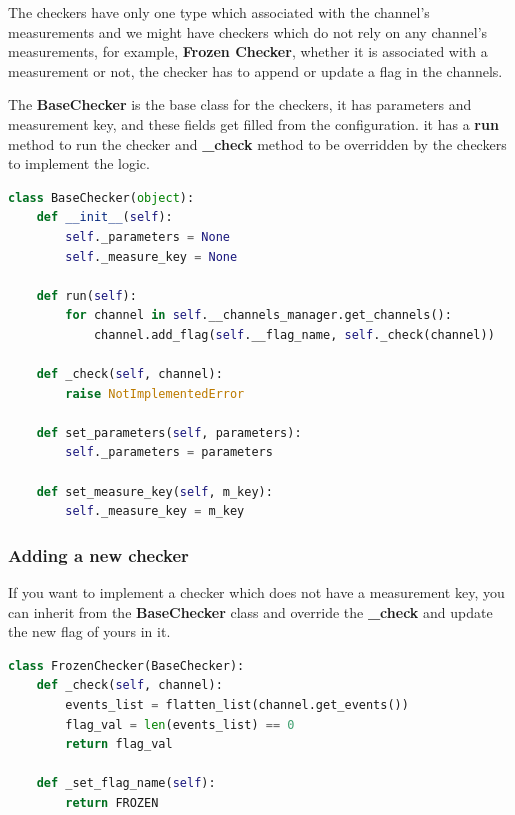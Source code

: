 The checkers have only one type which associated with the channel's measurements and we might have checkers
which do not rely on any channel's measurements, for example, \textbf{Frozen Checker}, whether it is associated
with a measurement or not, the checker has to append or update a flag in the channels.

The \textbf{BaseChecker} is the base class for the checkers, it has parameters and measurement key, 
and these fields get filled from the configuration. it has a \textbf{run} method to run the checker and
\textbf{\_check} method to be overridden by the checkers to implement the logic.
\newline
\begin{lstlisting}[language=Python, caption={BaseChecker implementation},captionpos=b]
class BaseChecker(object):
    def __init__(self):
        self._parameters = None
        self._measure_key = None

    def run(self):
		for channel in self.__channels_manager.get_channels():
			channel.add_flag(self.__flag_name, self._check(channel))

	def _check(self, channel):
		raise NotImplementedError

    def set_parameters(self, parameters):
        self._parameters = parameters

    def set_measure_key(self, m_key):
        self._measure_key = m_key

\end{lstlisting}

\subsubsection{Adding a new checker}
If you want to implement a checker which does not have a measurement key, you can inherit from the \textbf{BaseChecker}
class and override the \textbf{\_check} and update the new flag of yours in it.

\begin{lstlisting}[language=Python, caption={Frozen checker's implementation},captionpos=b]
class FrozenChecker(BaseChecker):
    def _check(self, channel):
        events_list = flatten_list(channel.get_events())
        flag_val = len(events_list) == 0
        return flag_val

    def _set_flag_name(self):
        return FROZEN
\end{lstlisting}

